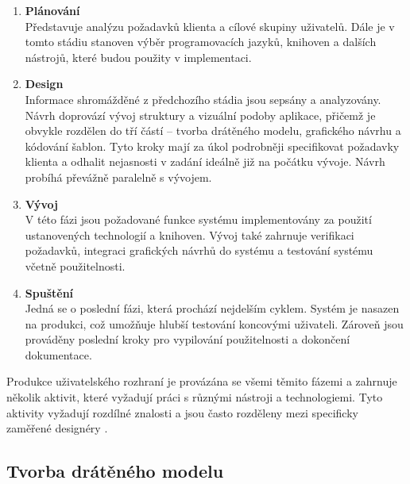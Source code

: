 \begin{enumerate}[leftmargin=1cm]
    \item \textbf{Plánování}\\
          Představuje analýzu požadavků klienta a cílové skupiny uživatelů. Dále je v tomto stádiu stanoven výběr programovacích jazyků, knihoven a dalších nástrojů, které budou použity v implementaci.

    \item \textbf{Design}\\
          Informace shromážděné z předchozího stádia jsou sepsány a analyzovány. Návrh doprovází vývoj struktury a vizuální podoby aplikace, přičemž je obvykle rozdělen do tří částí -- tvorba drátěného modelu, grafického návrhu a kódování šablon. Tyto kroky mají za úkol podrobněji specifikovat požadavky klienta a odhalit nejasnosti v zadání ideálně již na počátku vývoje. Návrh probíhá převážně paralelně s vývojem.

    \item \textbf{Vývoj}\\
          V této fázi jsou požadované funkce systému implementovány za použití ustanovených technologií a knihoven. Vývoj také zahrnuje verifikaci požadavků, integraci grafických návrhů do systému a testování systému včetně použitelnosti.

    \item \textbf{Spuštění}\\
          Jedná se o poslední fázi, která prochází nejdelším cyklem. Systém je nasazen na produkci, což umožňuje hlubší testování koncovými uživateli. Zároveň jsou prováděny poslední kroky pro vypilování použitelnosti a dokončení dokumentace.

\end{enumerate}

Produkce uživatelského rozhraní je provázána se všemi těmito fázemi a zahrnuje několik aktivit, které vyžadují práci s různými nástroji a technologiemi. Tyto aktivity vyžadují rozdílné znalosti a jsou často rozděleny mezi specificky zaměřené designéry \cite{5}.

\subsection{Tvorba drátěného modelu}
\label{sec:wireframing}

